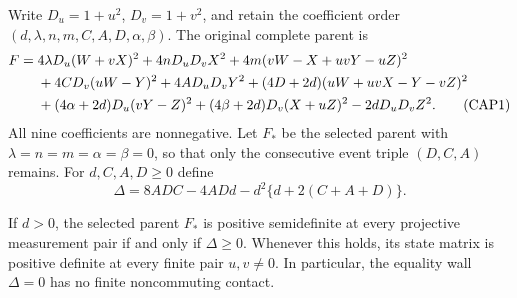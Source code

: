 Write $D_u=1+u^2$, $D_v=1+v^2$, and retain the coefficient order
$(d,\lambda,n,m,C,A,D,\alpha,\beta)$.  The original complete parent is
\begin{align}
F={}&4\lambda D_u(W+vX)^2+4nD_uD_vX^2
 +4m(vW-X+uvY-uZ)^2\notag\\
&+4CD_v(uW-Y)^2+4AD_uD_vY^2
 +(4D+2d)(uW+uvX-Y-vZ)^2\notag\\
&+(4\alpha+2d)D_u(vY-Z)^2
 +(4\beta+2d)D_v(X+uZ)^2-2dD_uD_vZ^2.
\tag{CAP1}
\end{align}
All nine coefficients are nonnegative.  Let $F_*$ be the selected parent
with $\lambda=n=m=\alpha=\beta=0$, so that only the consecutive event
triple $(D,C,A)$ remains.  For $d,C,A,D\geq0$ define
\[
\Delta=8ADC-4ADd-d^2\{d+2(C+A+D)\}.
\tag{CAP2}
\]

\begin{proposition}
If $d>0$, the selected parent $F_*$ is positive semidefinite at every
projective measurement pair if and only if $\Delta\geq0$.  Whenever
this holds, its state matrix is positive definite at every finite pair
$u,v\ne0$.  In particular, the equality wall $\Delta=0$ has no finite
noncommuting contact.
\end{proposition}

